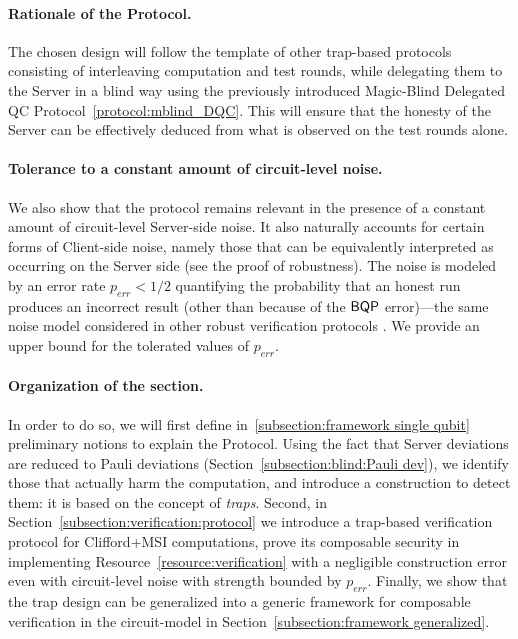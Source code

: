 \paragraph{Rationale of the Protocol.}
The chosen design will follow the template of other trap-based protocols consisting of interleaving computation and test rounds, while delegating them to the Server in a blind way using the previously introduced Magic-Blind Delegated QC Protocol~\ref{protocol:mblind_DQC}. This will ensure that the honesty of the Server can be effectively deduced from what is observed on the test rounds alone.

\paragraph{Tolerance to a constant amount of circuit-level noise.}
We also show that the protocol remains relevant in the presence of a constant amount of circuit-level Server-side noise. It also naturally accounts for certain forms of Client-side noise, namely those that can be equivalently interpreted as occurring on the Server side (see the proof of robustness).
The noise is modeled by an error rate $p_{err}<1/2$ quantifying the probability that an honest run produces an incorrect result (other than because of the $\textsf{BQP}$ error)—the same noise model considered in other robust verification protocols \cite{LMKO21verifying,BN25noise}. We provide an upper bound for the tolerated values of $p_{err}$.

\paragraph{Organization of the section.}
In order to do so, we will first define in~\ref{subsection:framework single qubit} preliminary notions to explain the Protocol. Using the fact that Server deviations are reduced to Pauli deviations (Section~\ref{subsection:blind:Pauli dev}), we identify those that actually harm the computation, and introduce a construction to detect them: it is based on the concept of \emph{traps}.
Second, in Section~\ref{subsection:verification:protocol} we introduce a trap-based verification protocol for Clifford+MSI computations, prove its composable security in implementing Resource~\ref{resource:verification} with a negligible construction error even with circuit-level noise with strength bounded by \(p_{err}\). Finally, we show that the trap design can be generalized into a generic framework for composable verification in the circuit-model in Section~\ref{subsection:framework generalized}.

